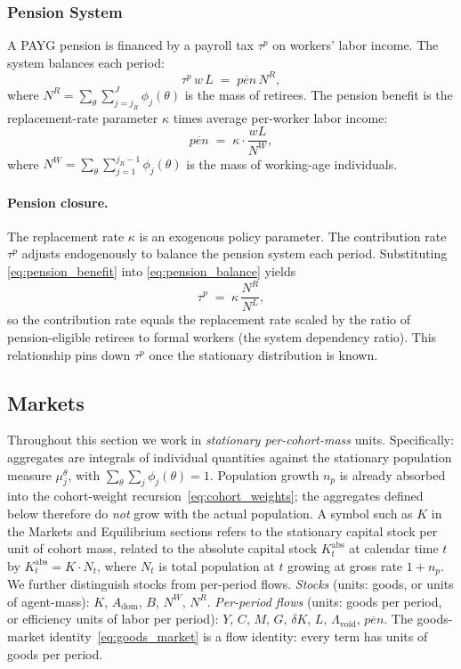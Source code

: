 \documentclass[12pt,a4paper]{article}
\begin{document}
\subsubsection{Pension System}
\label{subsubsec:pension}
A PAYG pension is financed by a payroll tax $\tau^p$ on workers' labor income. The system balances each period:
\begin{equation}
\label{eq:pension_balance}
\tau^p\, w\, L \;=\; \overline{pen}\, N^R,
\end{equation}
where $N^R = \sum_\theta \sum_{j=j_R}^{J} \phi_j(\theta)$ is the mass of retirees. The pension benefit is the replacement-rate parameter $\kappa$ times average per-worker labor income:
\begin{equation}
\label{eq:pension_benefit}
\overline{pen} \;=\; \kappa \cdot \frac{w L}{N^W},
\end{equation}
where $N^W = \sum_\theta \sum_{j=1}^{j_R - 1} \phi_j(\theta)$ is the mass of working-age individuals.

\paragraph{Pension closure.}
The replacement rate $\kappa$ is an exogenous policy parameter. The contribution rate $\tau^p$ adjusts endogenously to balance the pension system each period. Substituting \eqref{eq:pension_benefit} into \eqref{eq:pension_balance} yields
\begin{equation}
\label{eq:pension_contribution}
\tau^p \;=\; \kappa\, \frac{N^R}{N^L},
\end{equation}
so the contribution rate equals the replacement rate scaled by the ratio of pension-eligible retirees to formal workers (the system dependency ratio). This relationship pins down $\tau^p$ once the stationary distribution is known.


\subsection{Markets}
\label{subsec:markets}
\par Throughout this section we work in \emph{stationary per-cohort-mass} units. Specifically: aggregates are integrals of individual quantities against the stationary population measure $\mu_j^\theta$, with $\sum_\theta \sum_j \phi_j(\theta) = 1$. Population growth $n_p$ is already absorbed into the cohort-weight recursion~\eqref{eq:cohort_weights}; the aggregates defined below therefore do \emph{not} grow with the actual population. A symbol such as $K$ in the Markets and Equilibrium sections refers to the stationary capital stock per unit of cohort mass, related to the absolute capital stock $K^{\mathrm{abs}}_t$ at calendar time $t$ by $K^{\mathrm{abs}}_t = K \cdot N_t$, where $N_t$ is total population at $t$ growing at gross rate $1+n_p$. We further distinguish stocks from per-period flows. \emph{Stocks} (units: goods, or units of agent-mass): $K$, $A_{\mathrm{dom}}$, $B$, $N^W$, $N^R$. \emph{Per-period flows} (units: goods per period, or efficiency units of labor per period): $Y$, $C$, $M$, $G$, $\delta K$, $L$, $\Lambda_{\mathrm{void}}$, $\overline{pen}$. The goods-market identity~\eqref{eq:goods_market} is a flow identity: every term has units of goods per period.
\end{document}
